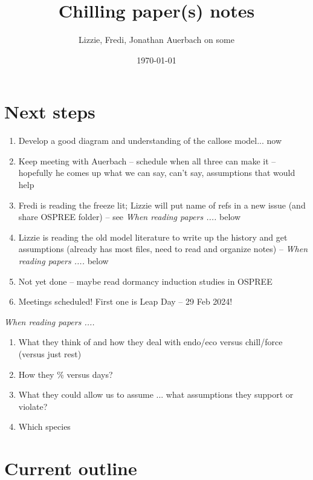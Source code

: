 \documentclass[11pt,letter]{article}
\begin{document}

\renewcommand{\refname}{\CHead{}}

\title{Chilling paper(s) notes}
\author{Lizzie, Fredi, Jonathan Auerbach on some}
\date{\today}
\maketitle
\tableofcontents

\section{Next steps}

\begin{enumerate}
\item Develop a good diagram and understanding of the callose model... now
\item Keep meeting with Auerbach -- schedule when all three can make it -- hopefully he comes up what we can say, can't say, assumptions that would help
\item Fredi is reading the freeze lit; Lizzie will put name of refs in a new issue (and share OSPREE folder) -- see \emph{When reading papers .... } below
\item Lizzie is reading the old model literature to write up the history and get assumptions (already has most files, need to read and organize notes) -- \emph{When reading papers .... } below
\item Not yet done -- maybe read dormancy induction studies in OSPREE 
\item Meetings scheduled! First one is Leap Day -- 29 Feb 2024!
\end{enumerate}

\emph{When reading papers .... }
\begin{enumerate}
\item What they think of and how they deal with endo/eco versus chill/force (versus just rest)
\item How they \% versus days?
\item What they could allow us to assume ... what assumptions they support or violate?
\item Which species
\end{enumerate}


\section{Current outline}
\end{document}
